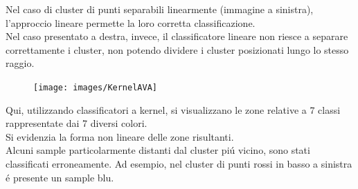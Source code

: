 \documentclass[12pt]{article}
\begin{document}
Nel caso di cluster di punti separabili linearmente (immagine a sinistra), l'approccio lineare permette
la loro corretta classificazione. \\
Nel caso presentato a destra, invece, il classificatore lineare non riesce a separare correttamente i cluster,
non potendo dividere i cluster posizionati lungo lo stesso raggio.
\begin{figure}[H]
  \centering
  \texttt{[image: images/KernelAVA]}
\end{figure}
Qui, utilizzando classificatori a kernel, si visualizzano le zone relative a 7 classi rappresentate dai 7 diversi colori. \\
Si evidenzia la forma non lineare delle zone risultanti. \\
Alcuni sample particolarmente distanti dal cluster piú vicino, sono stati classificati erroneamente.
Ad esempio, nel cluster di punti rossi in basso a sinistra é presente un sample blu.
\end{document}
